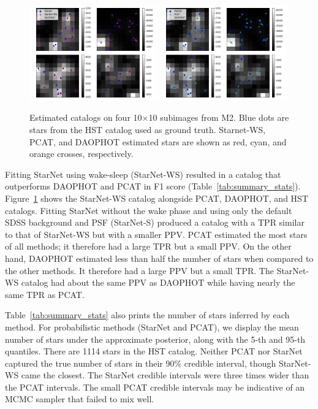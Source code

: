 \begin{figure}[tb]
    \centering
    \includegraphics[width=0.49\textwidth]{figures/m2_results/example_subimages_ws.png}
    \includegraphics[width=0.49\textwidth]{figures/m2_results/example_subimages_pcat.png}
    \caption{Estimated catalogs on four 10$\times$10 subimages from
    M2. Blue dots are stars from the HST catalog used as ground truth. 
    Starnet-WS, PCAT, and DAOPHOT estimated stars are shown as
    red, cyan, and orange crosses, respectively. }
    \label{fig:example_subimages}
\end{figure}

Fitting StarNet using wake-sleep (StarNet-WS) resulted in a catalog that outperforms DAOPHOT and PCAT in F1 score (Table~\ref{tab:summary_stats}). 
Figure~\ref{fig:example_subimages} shows the StarNet-WS catalog alongside PCAT, DAOPHOT, and HST catalogs. 
Fitting StarNet without the wake phase
and using only the default SDSS background and PSF (StarNet-S) produced a catalog with a TPR similar to that of StarNet-WS but with a smaller PPV.
PCAT estimated the most stars of all methods; it therefore had a large TPR but a small PPV. 
On the other hand, DAOPHOT estimated less than half the number of stars when compared to the other methods. It therefore had a large PPV but a small TPR. 
The StarNet-WS catalog had about the same PPV as DAOPHOT while having nearly the same TPR as PCAT. 

Table~\ref{tab:summary_stats} also prints the number of stars inferred by each method. 
For probabilistic methods (StarNet and PCAT), we display the mean number of stars under the approximate posterior, along with the 5-th and 95-th quantiles. 
There are 1114 stars in the HST catalog.
Neither PCAT nor StarNet captured the true number of stars in their 90\% credible interval, though StarNet-WS came the closest. 
The StarNet credible intervals were three times wider than the PCAT intervals.
The small PCAT credible intervals may be indicative of an MCMC sampler that failed to mix well. 


